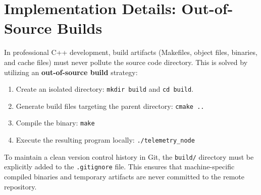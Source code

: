 \documentclass{article}
\begin{document}
\section{Implementation Details: Out-of-Source Builds}
In professional C++ development, build artifacts (Makefiles, object files, binaries, and cache files) must never pollute the source code directory. 
This is solved by utilizing an \textbf{out-of-source build} strategy:

\begin{enumerate}
    \item Create an isolated directory: \texttt{mkdir build} and \texttt{cd build}.
    \item Generate build files targeting the parent directory: \texttt{cmake ..}
    \item Compile the binary: \texttt{make}
    \item Execute the resulting program locally: \texttt{./telemetry\_node}
\end{enumerate}

To maintain a clean version control history in Git, the \texttt{build/} directory must be explicitly added to the \texttt{.gitignore} file. 
This ensures that machine-specific compiled binaries and temporary artifacts are never committed to the remote repository.
\end{document}
